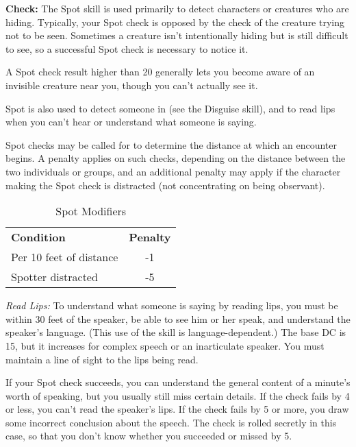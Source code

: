
\textbf{Check:} The Spot skill is used primarily to detect characters or creatures 
who are hiding. Typically, your Spot check is opposed by the  check of the 
creature trying not to be seen. Sometimes a creature isn't intentionally hiding 
but is still difficult to see, so a successful Spot check is necessary to notice 
it.

A Spot check result higher than 20 generally lets you become aware of an invisible 
creature near you, though you can't actually see it.

Spot is also used to detect someone in  (see the Disguise skill), and to 
read lips when you can't hear or understand what someone is saying.

Spot checks may be called for to determine the distance at which an encounter begins. 
A penalty applies on such checks, depending on the distance between the two individuals 
or groups, and an additional penalty may apply if the character making the Spot 
check is distracted (not concentrating on being observant).

\begin{table}[htb]
\caption{Spot Modifiers}
\centering
\begin{tabular}{lc}
\textbf{Condition} & \textbf{Penalty}\\
Per 10 feet of distance & -1\\
Spotter distracted & -5\\
\end{tabular}
\end{table}

\textit{Read Lips:} To understand what someone is saying by reading lips, you must 
be within 30 feet of the speaker, be able to see him or her speak, and understand 
the speaker's language. (This use of the skill is language-dependent.) The base 
DC is 15, but it increases for complex speech or an inarticulate speaker. You must 
maintain a line of sight to the lips being read.

If your Spot check succeeds, you can understand the general content of a minute's 
worth of speaking, but you usually still miss certain details. If the check fails 
by 4 or less, you can't read the speaker's lips. If the check fails by 5 or more, 
you draw some incorrect conclusion about the speech. The check is rolled secretly 
in this case, so that you don't know whether you succeeded or missed by 5.

